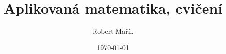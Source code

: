 \documentclass{article}
\begin{document}
\title{Aplikovaná matematika, cvičení}
\author{Robert Mařík}
\date{\today}


\maketitle
\tableofcontents

\clearpage


\end{document}
